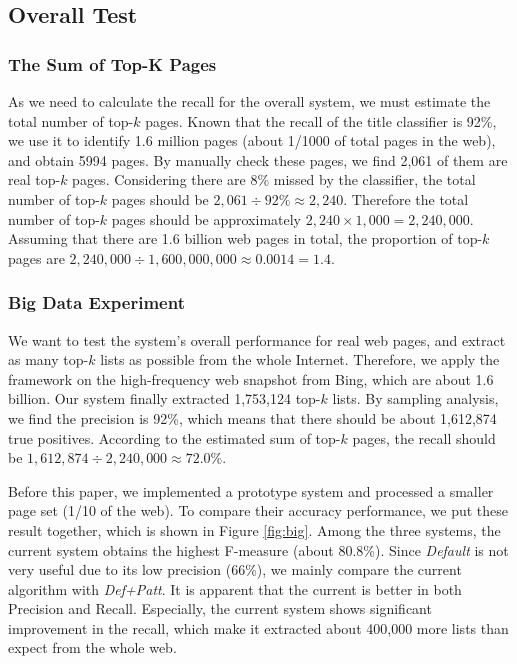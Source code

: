 \subsection{Overall Test}

\subsubsection{The Sum of Top-K Pages }
\label{sec:topKSum}
%

As we need to calculate the recall for the overall system,
we must estimate the total number of top-$k$ pages.
Known that the recall of the title classifier is 92\%,
we use it to identify 1.6 million pages
(about 1/1000 of total pages in the web), and obtain 5994 pages.
By manually check these pages,
we find 2,061 of them are real top-$k$ pages.
Considering there are 8\% missed by the classifier,
the total number of top-$k$ pages should be $2,061\div92\%\approx2,240$.
Therefore the total number of top-$k$ pages should be approximately $2,240\times1,000=2,240,000$.
Assuming that there are 1.6 billion web pages in total, the proportion of top-$k$ pages are $2,240,000 \div 1,600,000,000\approx0.0014=1.4$\textperthousand.

\subsubsection{Big Data Experiment}
\label{eval:bigdata}
We want to test the system's overall performance for real web pages,
and extract as many top-$k$ lists as possible from the whole Internet.
Therefore, we apply the framework on the high-frequency web snapshot from Bing,
which are about 1.6 billion.
Our system finally extracted 1,753,124 top-$k$ lists.
By sampling analysis, we find the precision is 92\%,
which means that there should be about 1,612,874 true positives.
According to the estimated sum of top-$k$ pages,
the recall should be $1,612,874\div2,240,000\approx72.0\%$.

Before this paper, we implemented a prototype system
and processed a smaller page set (1/10 of the web)\cite{ZZX2012KDD}.
To compare their accuracy performance, we put these result together,
which is shown in Figure \ref{fig:big}.
Among the three systems,
the current system obtains the highest F-measure (about 80.8\%).
Since {\em Default} is not very useful due to its low precision (66\%),
we mainly compare the current algorithm with {\em Def+Patt}.
It is apparent that the current is better in both Precision and Recall.
Especially, the current system shows significant improvement in the recall,
which make it extracted about 400,000 more lists than expect from the whole web.

